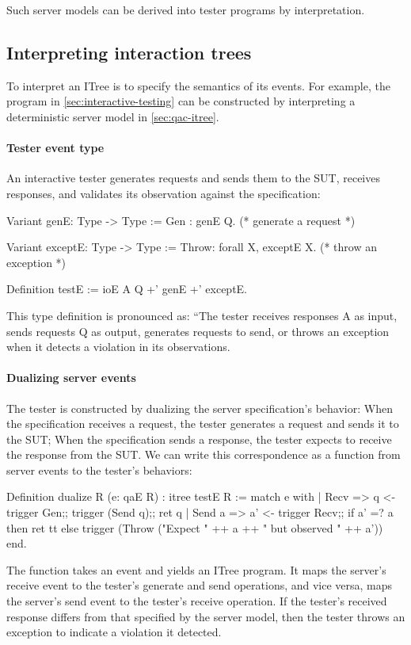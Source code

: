 Such server models can be derived into tester programs by interpretation.

\subsection{Interpreting interaction trees}
\label{sec:interp}
To interpret an ITree is to specify the semantics of its events.
For example, the  program in \autoref{sec:interactive-testing} can
be constructed by interpreting a deterministic server model in
\autoref{sec:qac-itree}.

\paragraph{Tester event type}
An interactive tester generates requests and sends them to the SUT, receives
responses, and validates its observation against the specification:
\begin{coq}
  Variant genE: Type -> Type :=
    Gen : genE Q.          (* generate a request *)

  Variant exceptE: Type -> Type :=
    Throw: forall X, exceptE X. (* throw an exception *)

  Definition testE := ioE A Q +' genE +' exceptE.
\end{coq}
This type definition is pronounced as: ``The tester receives responses \ilc A as
input, sends requests \ilc Q as output, generates requests to send, or throws an
exception when it detects a violation in its observations.

\paragraph{Dualizing server events}
The tester is constructed by dualizing the server specification's behavior: When
the specification receives a request, the tester generates a request and sends
it to the SUT; When the specification sends a response, the tester expects to
receive the response from the SUT.  We can write this correspondence as a
function from server events to the tester's behaviors:
\begin{coq}
  Definition dualize {R} (e: qaE R) : itree testE R :=
    match e with
    | Recv   => q <- trigger Gen;;
                trigger (Send q);;
                ret q
    | Send a => a' <- trigger Recv;;
                if a' =? a
                then ret tt
                else trigger (Throw ("Expect " ++ a ++ " but observed " ++ a'))
    end.
\end{coq}
The  function takes an event and yields an ITree program.  It maps
the server's receive event to the tester's generate and send operations, and
vice versa, maps the server's send event to the tester's receive operation.  If
the tester's received response differs from that specified by the server model,
then the tester throws an exception to indicate a violation it detected.

